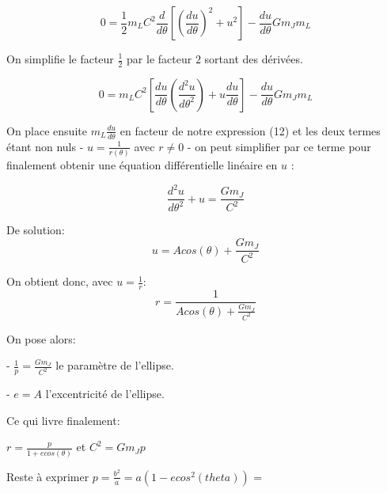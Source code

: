 \documentclass{aa}
\begin{document}
\begin{equation}
    0 = \frac{1}{2}m_LC^{2}\frac{d}{d\theta}\left[ \left( \frac{du}{d\theta}\right) ^{2} + u^{2}\right] - \frac{du}{d\theta}Gm_Jm_L  
\end{equation} 

On simplifie le facteur $\frac{1}{2}$ par le facteur $2$ sortant des dérivées.

\begin{equation}
         0 = m_LC^{2}\left[ \frac{du}{d\theta}\left( \frac{d^{2}u}{{d\theta^{2}}}\right) + u\frac{du}{d\theta} \right] - \frac{du}{d\theta}Gm_Jm_L  
\end{equation}

On place ensuite $m_L\frac{du}{d\theta}$ en facteur de notre expression (12) et les deux termes étant non nuls - $ u = \frac{1}{r(\theta)}$ avec $ r \ne 0$ - on peut simplifier par ce terme pour finalement obtenir une équation différentielle linéaire en $u$ : 

\begin{equation}
    \frac{d^{2}u}{{d\theta}^{2}} + u = \frac{Gm_J}{C^{2}}
\end{equation}
\begin{flushleft}
    De solution:
    \begin{equation}
       u = Acos(\theta) + \frac{Gm_J}{C^{2}}
    \end{equation}

On obtient donc, avec $ u = \frac{1}{r}$:
\begin{equation}
    r = \frac{1}{Acos(\theta) + \frac{Gm_J}{C^{2}}}
\end{equation}
\end{flushleft}

\begin{flushleft}
    On pose alors:
    \item - $\frac{1}{p} = \frac{Gm_J}{C^{2}}$ le paramètre de l'ellipse.
    \item - $e = A$  l'excentricité de l'ellipse.\break
    
    Ce qui livre finalement:
    \begin{center}
        $r = \frac{p}{1 + ecos(\theta)}$ et $C^{2} = Gm_Jp $
    \end{center}
    
\end{flushleft}
Reste à exprimer  $p = \frac{b^2}{a} = a(1-ecos^2(theta)) $ =

\end{document}
